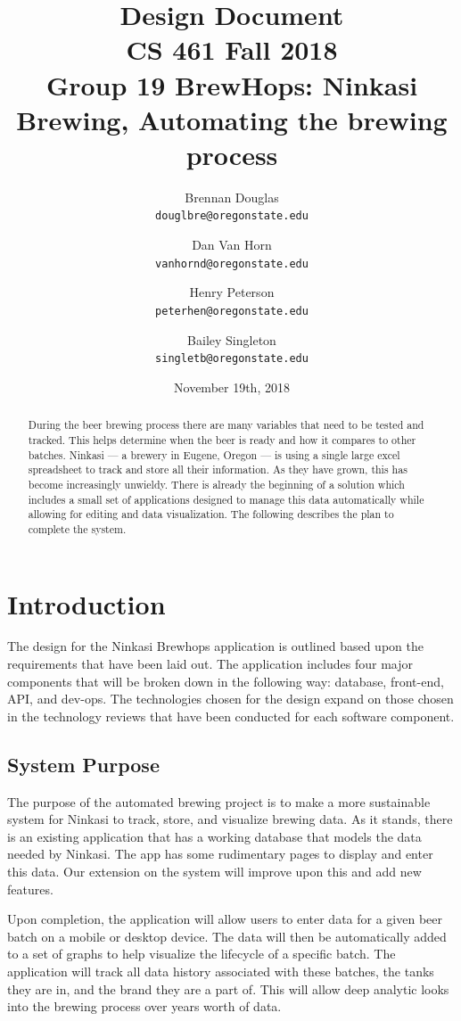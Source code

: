\documentclass[draftclsnofoot,onecolumn,journal,letterpaper,compsoc,10pt]{IEEEtran}
\title{Design Document\\\large CS 461 Fall 2018\\Group 19 BrewHops: Ninkasi Brewing, Automating the brewing process}
\author{
    Brennan Douglas \\
    \texttt{douglbre@oregonstate.edu} \\
    \and
    Dan Van Horn \\
    \texttt{vanhornd@oregonstate.edu} \\
    \and
    Henry Peterson \\
    \texttt{peterhen@oregonstate.edu} \\
    \and
    Bailey Singleton \\
    \texttt{singletb@oregonstate.edu} \\
}
\date{November 19th, 2018}
\begin{document}
\begin{titlingpage}
    \maketitle
    \begin{abstract}
    	During the beer brewing process there are many variables that need to be tested and tracked. This helps determine when the beer is ready and how it compares to other batches. Ninkasi --- a brewery in Eugene, Oregon --- is using a single large excel spreadsheet to track and store all their information. As they have grown, this has become increasingly unwieldy. There is already the beginning of a solution which includes a small set of applications designed to manage this data automatically while allowing for editing and data visualization. The following describes the plan to complete the system.
    \end{abstract}
    \pagebreak
    \tableofcontents
\end{titlingpage}

\section{Introduction}

The design for the Ninkasi Brewhops application is outlined based upon the requirements that have been laid out. The application includes four major components that will be broken down in the following way: database, front-end, API, and dev-ops. The technologies chosen for the design expand on those chosen in the technology reviews that have been conducted for each software component.

    \subsection{System Purpose}

    The purpose of the automated brewing project is to make a more sustainable system for Ninkasi to track, store, and visualize brewing data.  As it stands, there is an existing application that has a working database that models the data needed by Ninkasi. The app has some rudimentary pages to display and enter this data.  Our extension on the system will improve upon this and add new features.
    
    Upon completion, the application will allow users to enter data for a given beer batch on a mobile or desktop device. The data will then be automatically added to a set of graphs to help visualize the lifecycle of a specific batch. The application will track all data history associated with these batches, the tanks they are in, and the brand they are a part of. This will allow deep analytic looks into the brewing process over years worth of data.
    
\end{document}
